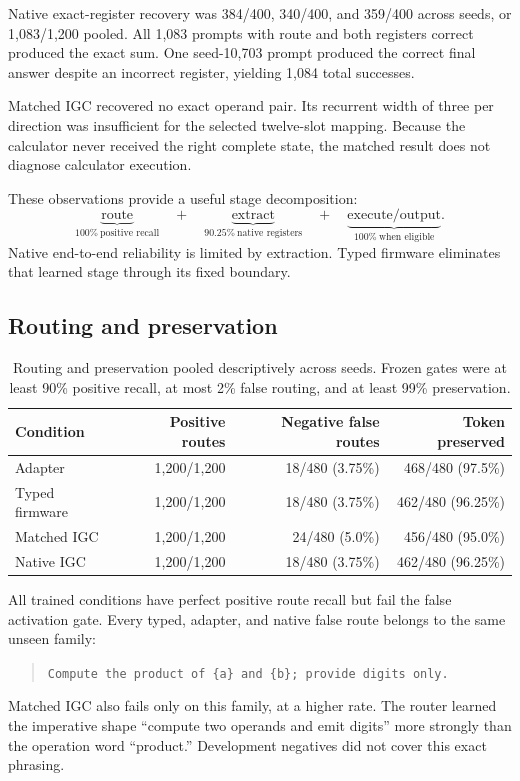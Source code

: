\documentclass[11pt]{article}
\newcommand{\code}[1]{\texttt{#1}}
\begin{document}
Native exact-register recovery was 384/400, 340/400, and 359/400 across seeds,
or 1,083/1,200 pooled. All 1,083 prompts with route and both registers correct
produced the exact sum. One seed-10,703 prompt produced the correct final
answer despite an incorrect register, yielding 1,084 total successes.

Matched IGC recovered no exact operand pair. Its recurrent width of three per
direction was insufficient for the selected twelve-slot mapping. Because the
calculator never received the right complete state, the matched result does
not diagnose calculator execution.

These observations provide a useful stage decomposition:
\[
\underbrace{\text{route}}_{100\%\ \text{positive recall}}
\quad+\quad
\underbrace{\text{extract}}_{90.25\%\ \text{native registers}}
\quad+\quad
\underbrace{\text{execute/output}}_{100\%\ \text{when eligible}}.
\]
Native end-to-end reliability is limited by extraction. Typed firmware
eliminates that learned stage through its fixed boundary.

\subsection{Routing and preservation}

\begin{table}[H]
\centering
\small
\begin{tabular}{lrrr}
\toprule
Condition & Positive routes & Negative false routes & Token preserved\\
\midrule
Adapter & 1,200/1,200 & 18/480 (3.75\%) & 468/480 (97.5\%)\\
Typed firmware & 1,200/1,200 & 18/480 (3.75\%) & 462/480 (96.25\%)\\
Matched IGC & 1,200/1,200 & 24/480 (5.0\%) & 456/480 (95.0\%)\\
Native IGC & 1,200/1,200 & 18/480 (3.75\%) & 462/480 (96.25\%)\\
\bottomrule
\end{tabular}
\caption{Routing and preservation pooled descriptively across seeds. Frozen
gates were at least 90\% positive recall, at most 2\% false routing, and at
least 99\% preservation.}
\label{tab:routing}
\end{table}

All trained conditions have perfect positive route recall but fail the false
activation gate. Every typed, adapter, and native false route belongs to the
same unseen family:
\begin{quote}
\code{Compute the product of \{a\} and \{b\}; provide digits only.}
\end{quote}
Matched IGC also fails only on this family, at a higher rate. The router
learned the imperative shape ``compute two operands and emit digits'' more
strongly than the operation word ``product.'' Development negatives did not
cover this exact phrasing.
\end{document}
